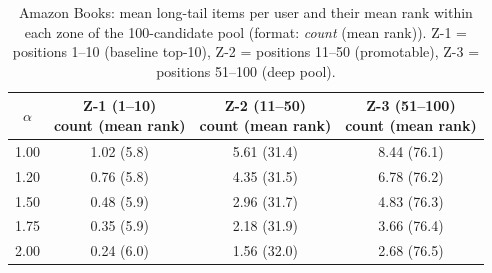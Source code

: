 \begin{table}[htbp]
\centering
\caption{Amazon Books: mean long-tail items per user and their mean rank within each zone of the 100-candidate pool (format: \emph{count} (mean rank)). Z-1 = positions 1--10 (baseline top-10), Z-2 = positions 11--50 (promotable), Z-3 = positions 51--100 (deep pool).}
\label{tab:pool_position_ab}
\begin{tabular}{cccc}
\toprule
$\alpha$ & \makecell{Z-1 (1--10)\\count (mean rank)} & \makecell{Z-2 (11--50)\\count (mean rank)} & \makecell{Z-3 (51--100)\\count (mean rank)} \\
\midrule
\rowcolor{gray!8} 1.00 & 1.02 (5.8) & 5.61 (31.4) & 8.44 (76.1) \\
1.20 & 0.76 (5.8) & 4.35 (31.5) & 6.78 (76.2) \\
\rowcolor{gray!8} 1.50 & 0.48 (5.9) & 2.96 (31.7) & 4.83 (76.3) \\
1.75 & 0.35 (5.9) & 2.18 (31.9) & 3.66 (76.4) \\
\rowcolor{gray!8} 2.00 & 0.24 (6.0) & 1.56 (32.0) & 2.68 (76.5) \\
\bottomrule
\end{tabular}
\end{table}
